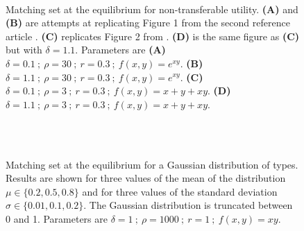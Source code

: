 \begin{figure}[!ht]
	\centering
	\quad
	\\
	\quad
	\caption{Matching set at the equilibrium for non-transferable utility. \textbf{(A)} and \textbf{(B)} are attempts at replicating Figure 1 from the second reference article \citep{smith_marriage_2006}. \textbf{(C)} replicates Figure 2 from \citep{smith_marriage_2006}. \textbf{(D)} is the same figure as \textbf{(C)} but with $\delta=1.1$. Parameters are \textbf{(A)} $\delta=0.1 \ ; \ \rho=30 \ ; \ r=0.3 \ ; \ f(x,y)=e^{xy}$. \textbf{(B)} $\delta=1.1 \ ; \ \rho=30 \ ; \ r=0.3 \ ; \ f(x,y)=e^{xy}$. \textbf{(C)} $\delta=0.1 \ ; \ \rho=3 \ ; \ r=0.3 \ ; \ f(x,y)=x+y+xy$. \textbf{(D)} $\delta=1.1 \ ; \ \rho=3 \ ; \ r=0.3 \ ; \ f(x,y)=x+y+xy$.}
	\label{fig:fig3}
\end{figure}
 




\begin{figure}[!ht]
	\centering
	\quad
	\quad
	\quad
	\\
	\quad
	\quad
	\quad
	\\
	\quad
	\quad
	\quad
	\caption{Matching set at the equilibrium for a Gaussian distribution of types. Results are shown for three values of the mean of the distribution $\mu \in \{0.2,0.5,0.8\}$ and for three values of the standard deviation $\sigma \in \{0.01,0.1,0.2\}$. The Gaussian distribution is truncated between 0 and 1. Parameters are $\delta=1 \ ; \ \rho=1000 \ ; \ r=1 \ ; \ f(x,y)=xy$.}
	\label{fig:fig4}
\end{figure}